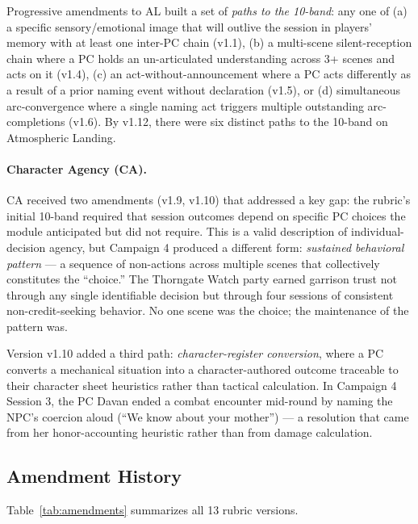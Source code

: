 Progressive amendments to AL built a set of \textit{paths to the 10-band}: any one of
(a) a specific sensory/emotional image that will outlive the session in players' memory
with at least one inter-PC chain (v1.1), (b) a multi-scene silent-reception chain
where a PC holds an un-articulated understanding across 3+ scenes and acts on it (v1.4),
(c) an act-without-announcement where a PC acts differently as a result of a prior naming
event without declaration (v1.5), or (d) simultaneous arc-convergence where a single
naming act triggers multiple outstanding arc-completions (v1.6). By v1.12, there were
six distinct paths to the 10-band on Atmospheric Landing.

\paragraph{Character Agency (CA).}
CA received two amendments (v1.9, v1.10) that addressed a key gap: the rubric's
initial 10-band required that session outcomes depend on specific PC choices the module
anticipated but did not require. This is a valid description of individual-decision
agency, but Campaign 4 produced a different form: \textit{sustained behavioral pattern}
--- a sequence of non-actions across multiple scenes that collectively constitutes the
``choice.'' The Thorngate Watch party earned garrison trust not through any single
identifiable decision but through four sessions of consistent non-credit-seeking
behavior. No one scene was the choice; the maintenance of the pattern was.

Version v1.10 added a third path: \textit{character-register conversion}, where a PC
converts a mechanical situation into a character-authored outcome traceable to their
character sheet heuristics rather than tactical calculation. In Campaign 4 Session 3,
the PC Davan ended a combat encounter mid-round by naming the NPC's coercion aloud
(``We know about your mother'') --- a resolution that came from her honor-accounting
heuristic rather than from damage calculation.

\subsection{Amendment History}

Table~\ref{tab:amendments} summarizes all 13 rubric versions.

